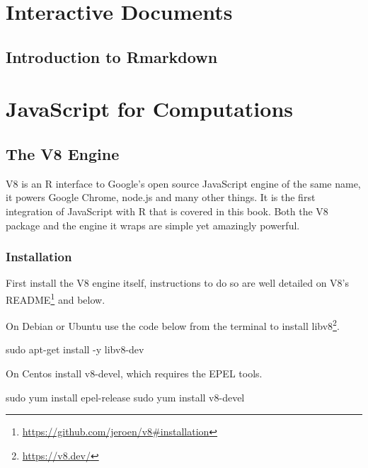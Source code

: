 \documentclass[
]{krantz}
\makeatletter
\newenvironment{Shaded}{\begin{snugshade}}{\end{snugshade}}
\newcommand{\FunctionTok}[1]{\textcolor[rgb]{0,0,0}{#1}}
\newcommand{\NormalTok}[1]{#1}
\renewcommand{\href}[2]{#2\footnote{\url{#1}}}
\newenvironment{kframe}{%
\medskip{}
\setlength{\fboxsep}{.8em}
 \def\at@end@of@kframe{}%
 \ifinner\ifhmode%
  \def\at@end@of@kframe{\end{minipage}}%
  \begin{minipage}{\columnwidth}%
 \fi\fi%
 \def\FrameCommand##1{\hskip\@totalleftmargin \hskip-\fboxsep
 \colorbox{shadecolor}{##1}\hskip-\fboxsep
     \hskip-\linewidth \hskip-\@totalleftmargin \hskip\columnwidth}%
 \MakeFramed {\advance\hsize-\width
   \@totalleftmargin\z@ \linewidth\hsize
   \@setminipage}}%
 {\par\unskip\endMakeFramed%
 \at@end@of@kframe}
\renewenvironment{Shaded}{\begin{kframe}}{\end{kframe}}
\makeatother
\begin{document}
\hypertarget{part-interactive-documents}{%
\part{Interactive Documents}\label{part-interactive-documents}}

\hypertarget{rmd-intro}{%
\chapter{Introduction to Rmarkdown}\label{rmd-intro}}

\hypertarget{part-javascript-for-computations}{%
\part{JavaScript for Computations}\label{part-javascript-for-computations}}

\hypertarget{v8}{%
\chapter{The V8 Engine}\label{v8}}

V8 is an R interface to Google's open source JavaScript engine of the same name, it powers Google Chrome, node.js and many other things. It is the first integration of JavaScript with R that is covered in this book. Both the V8 package and the engine it wraps are simple yet amazingly powerful.

\hypertarget{v8-installation}{%
\section{Installation}\label{v8-installation}}

First install the V8 engine itself, instructions to do so are well detailed on \href{https://github.com/jeroen/v8\#installation}{V8's README} and below.

On Debian or Ubuntu use the code below from the terminal to install \href{https://v8.dev/}{libv8}.

\begin{Shaded}
\begin{Highlighting}[]
\FunctionTok{sudo}\NormalTok{ apt{-}get install {-}y libv8{-}dev}
\end{Highlighting}
\end{Shaded}

On Centos install v8-devel, which requires the EPEL tools.

\begin{Shaded}
\begin{Highlighting}[]
\FunctionTok{sudo}\NormalTok{ yum install epel{-}release}
\FunctionTok{sudo}\NormalTok{ yum install v8{-}devel}
\end{Highlighting}
\end{Shaded}
\end{document}
